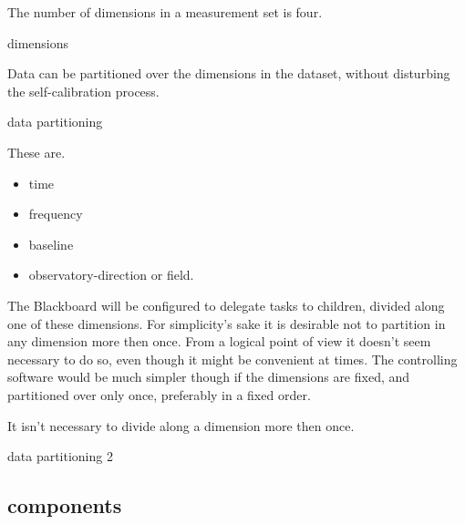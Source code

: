 \documentclass[]{lofar}
\begin{document}
      \begin{assumption}
        The number of dimensions in a measurement set is four.
        \caption{dimensions\label{ass:dimensions}}
      \end{assumption}

      \begin{assumption}
        Data can be partitioned over the dimensions in the dataset,
        without disturbing the self-calibration process.
        \caption{data partitioning\label{ass:partitioning}}
      \end{assumption}

      These are.

      \begin{itemize}

        \item 

          time

	\item 

          frequency

	\item 

          baseline

	\item 

          observatory-direction or field.

      \end{itemize}

      The Blackboard will be configured to delegate tasks to children,
      divided along one of these dimensions. For simplicity's sake it
      is desirable not to partition in any dimension more then
      once. From a logical point of view it doesn't seem necessary to
      do so, even though it might be convenient at times. The
      controlling software would be much simpler though if the
      dimensions are fixed, and partitioned over only once,
      preferably in a fixed order.

      \begin{assumption}
        It isn't necessary to divide along a dimension more then once.
        \caption{data partitioning 2\label{ass:devision}}
      \end{assumption}

    \subsection{components}
    \label{subsec:components}\hypertarget{subsec:components}{}
\end{document}
